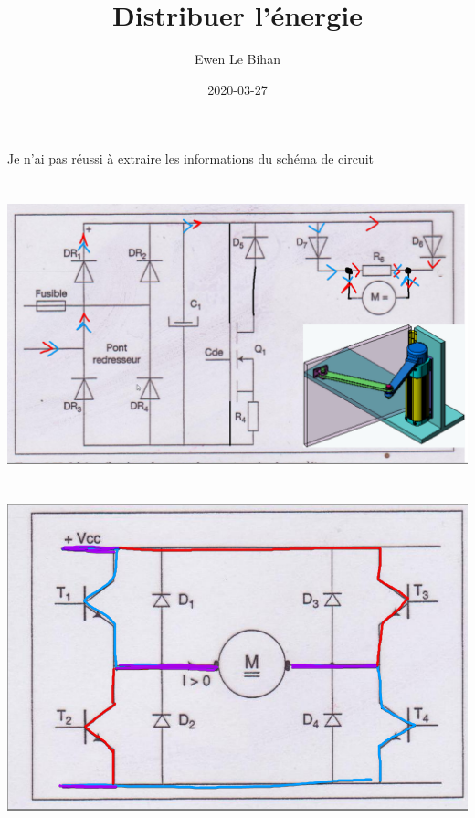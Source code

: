 \documentclass{article}
\title{Distribuer l'énergie}
\author{Ewen Le Bihan}
\date{2020-03-27}
\begin{document}
\maketitle

\section{}

Je n'ai pas réussi à extraire les informations du schéma de circuit

\section{}

\includegraphics[width=15cm]{exo2.png}

\section{}

\includegraphics[width=15cm]{exo3.png}
\end{document}
